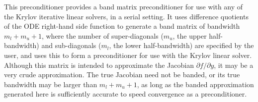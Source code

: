 This preconditioner provides a band matrix preconditioner for use with
any of the Krylov iterative linear solvers, in a serial setting.
It uses difference quotients of the ODE right-hand side function  to
generate a band matrix of bandwidth $m_l + m_u + 1$, where the number of
super-diagonals ($m_u$, the upper half-bandwidth) and sub-diagonals
($m_l$, the lower half-bandwidth) are specified by the user, and uses this to
form a preconditioner for use with the Krylov linear solver.
Although this matrix is intended to approximate the Jacobian
$\partial f / \partial y$, it may be a very crude approximation.  The true Jacobian
need not be banded, or its true bandwidth may be larger than $m_l + m_u + 1$, as
long as the banded approximation generated here is sufficiently accurate to
speed convergence as a preconditioner. 

